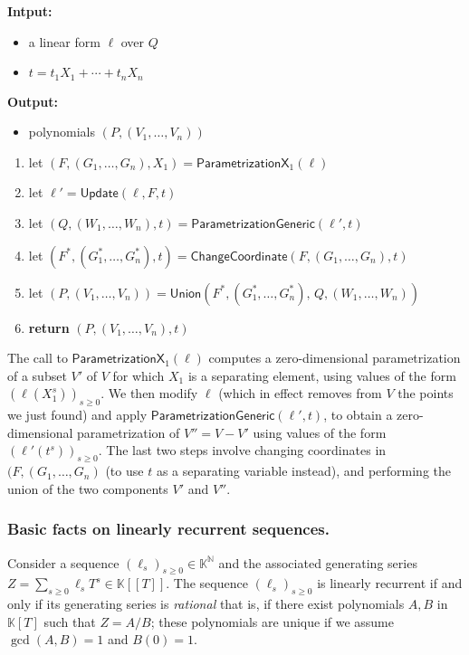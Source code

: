\documentclass[12pt]{article}
\def\N {\ensuremath{\mathbb{N}}}
\def\K {\ensuremath{\mathbb{K}}}
\def\K{\mathbb{K}}
\begin{document}
\begin{algorithm}[H]
	\caption{$\mathsf{Parametrization}(\ell,t)$} {\bf
		Intput:} \vspace{-0.5em}
	\begin{itemize}\setlength\itemsep{0em}
		\item a linear form $\ell$ over $Q$
		\item $t=t_1 X_1 + \cdots + t_n X_n$
	\end{itemize}
	{\bf Output:} \vspace{-0.5em}
	\begin{itemize}\setlength\itemsep{0em}
		\item polynomials $(P,(V_1,\dots,V_n))$
	\end{itemize}
	\begin{enumerate}
		\item let $(F,(G_1,\dots,G_n),X_1)=\mathsf{ParametrizationX}_1(\ell)$
		\item let $\ell'=\mathsf{Update}(\ell,F,t)$
		\item let $(Q,(W_1,\dots,W_n),t)=\mathsf{ParametrizationGeneric}(\ell',t)$
		\item let $(F^*,(G^*_1,\dots,G^*_n),t)=\mathsf{ChangeCoordinate}(F,(G_1,\dots,G_n),t)$
		\item let  $(P,(V_1,\dots,V_n))=\mathsf{Union}(F^*,(G^*_1,\dots,G^*_n),\, Q,(W_1,\dots,W_n))$
		\item \textbf{return} $(P,(V_1,\dots,V_n),t)$
	\end{enumerate}
\end{algorithm}

The call to $\mathsf{ParametrizationX}_1(\ell)$ computes a
zero-dimensional parametrization of a subset $V'$ of $V$ for which
$X_1$ is a separating element, using values of the form
$(\ell(X_1^s))_{s \ge 0}$. We then modify $\ell$ (which in effect
removes from $V$ the points we just found) and apply
$\mathsf{ParametrizationGeneric}(\ell',t)$, to obtain a
zero-dimensional parametrization of $V''=V-V'$ using values of the form
$(\ell'(t^s))_{s \ge 0}$. The last two steps involve changing
coordinates in $(F,(G_1,\dots,G_n)$ (to use $t$ as a separating
variable instead), and performing the union of the two components $V'$
and $V''$.

\subsubsection{Basic facts on linearly recurrent sequences.} Consider a sequence $(\ell_s)_{s \ge 0} \in \K^\N$
and the associated generating series $Z=\sum_{s \ge 0} \ell_s T^s \in
\K[[T]]$. The sequence $(\ell_s)_{s \ge 0}$ is {\rm linearly recurrent} if and
only if its generating series is {\em rational} that is, if there
exist polynomials $A,B$ in $\K[T]$ such that $Z=A/B$; these
polynomials are unique if we assume $\gcd(A,B)=1$ and $B(0)=1$. 
\end{document}
